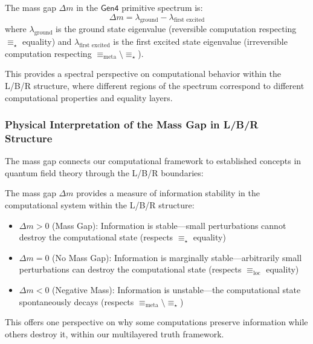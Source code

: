 \begin{theorem}
\begin{definition}
\label{def:mass-gap-spectrum-g6}
The mass gap $\Delta m$ in the $\mathsf{Gen4}$ primitive spectrum is:
\[
\Delta m = \lambda_{\text{ground}} - \lambda_{\text{first excited}}
\]
where $\lambda_{\text{ground}}$ is the ground state eigenvalue (reversible computation respecting $\equiv_\star$ equality) and $\lambda_{\text{first excited}}$ is the first excited state eigenvalue (irreversible computation respecting $\equiv_{\text{meta}} \setminus \equiv_\star$).
\end{definition}

This provides a spectral perspective on computational behavior within the L/B/R structure, where different regions of the spectrum correspond to different computational properties and equality layers.

\subsubsection{Physical Interpretation of the Mass Gap in L/B/R Structure}

The mass gap connects our computational framework to established concepts in quantum field theory through the L/B/R boundaries:

\begin{definition}
\label{def:mass-gap-stability-lbr}
The mass gap $\Delta m$ provides a measure of information stability in the computational system within the L/B/R structure:
\begin{itemize}
\item $\Delta m > 0$ (Mass Gap): Information is stable—small perturbations cannot destroy the computational state (respects $\equiv_\star$ equality)
\item $\Delta m = 0$ (No Mass Gap): Information is marginally stable—arbitrarily small perturbations can destroy the computational state (respects $\equiv_{\text{loc}}$ equality)
\item $\Delta m < 0$ (Negative Mass): Information is unstable—the computational state spontaneously decays (respects $\equiv_{\text{meta}} \setminus \equiv_\star$)
\end{itemize}
\end{definition}

This offers one perspective on why some computations preserve information while others destroy it, within our multilayered truth framework.


\end{theorem}
